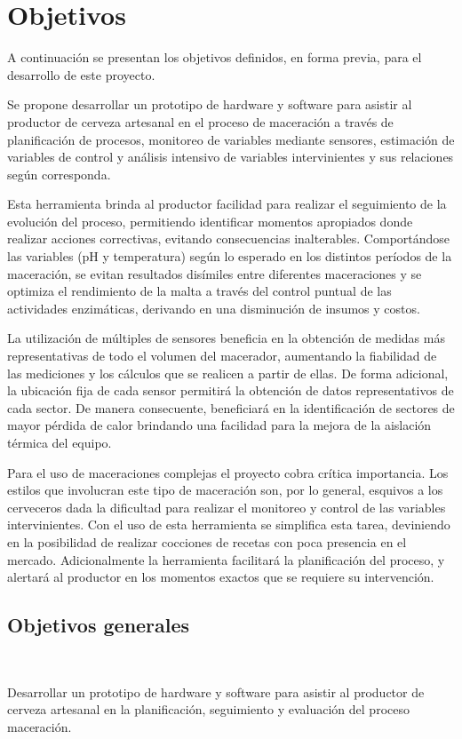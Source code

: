 \section{Objetivos}
\label{secccionObjetivos}
    \par
    A continuación se presentan los objetivos definidos, en forma previa, para el desarrollo de este proyecto.
    \par
    Se propone desarrollar un prototipo de hardware y software para asistir al productor de cerveza artesanal en el proceso de maceración a través de planificación de procesos, monitoreo de variables mediante sensores, estimación de variables de control y análisis intensivo de variables intervinientes y sus relaciones según corresponda.
    \par
    Esta herramienta brinda al productor facilidad para realizar el seguimiento de la evolución del proceso, permitiendo identificar momentos apropiados donde realizar acciones correctivas, evitando consecuencias inalterables. Comportándose las variables (pH y temperatura) según lo esperado en los distintos períodos de la maceración, se evitan resultados disímiles entre diferentes maceraciones y se optimiza el rendimiento de la malta a través del control puntual de las actividades enzimáticas, derivando en una disminución de insumos y costos.
    \par
    La utilización de múltiples de sensores beneficia en la obtención de medidas más representativas de todo el volumen del macerador, aumentando la fiabilidad de las mediciones y los cálculos que se realicen a partir de ellas. De forma adicional, la ubicación fija de cada sensor permitirá la obtención de datos representativos de cada sector. De manera consecuente, beneficiará en la identificación de sectores de mayor pérdida de calor brindando una facilidad para la mejora de la aislación térmica del equipo.
    \par
    Para el uso de maceraciones complejas el proyecto cobra crítica importancia. Los estilos que involucran este tipo de maceración son, por lo general, esquivos a los cerveceros dada la dificultad para realizar el monitoreo y control de las variables intervinientes. Con el uso de esta herramienta se simplifica esta tarea, deviniendo en la posibilidad de realizar cocciones de recetas con poca presencia en el mercado. Adicionalmente la herramienta facilitará la planificación del proceso, y alertará al productor en los momentos exactos que se requiere su intervención.


    \subsection{Objetivos generales}
    \
        \par
        Desarrollar un prototipo de hardware y software para asistir al productor de cerveza artesanal en la planificación, seguimiento y evaluación del proceso maceración. 
